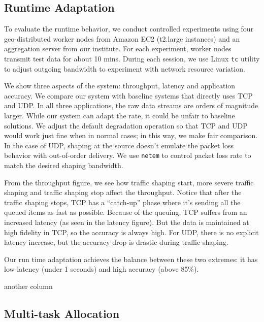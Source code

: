 \newpage

\subsection{Runtime Adaptation}
\label{sec:runtime-adaptation}

To evaluate the runtime behavior, we conduct controlled experiments using four
geo-distributed worker nodes from Amazon EC2 (t2.large instances) and an
aggregation server from our institute. For each experiment, worker nodes
transmit test data for about 10 mins. During each session, we use Linux
\texttt{tc} utility to adjust outgoing bandwidth to experiment with network
resource variation.

We show three aspects of the system: throughput, latency and application
accuracy. We compare our system with baseline systems that directly uses TCP and
UDP. In all three applications, the raw data streams are orders of magnitude
larger. While our system can adapt the rate, it could be unfair to baseline
solutions. We adjust the default degradation operation so that TCP and UDP would
work just fine when in normal cases; in this way, we make fair comparison. In
the case of UDP, shaping at the source doesn't emulate the packet loss behavior
with out-of-order delivery. We use \texttt{netem} to control packet loss rate to
match the desired shaping bandwidth.

From the throughput figure, we see how traffic shaping start, more severe
traffic shaping and traffic shaping stop affect the throughput. Notice that
after the traffic shaping stops, TCP has a ``catch-up'' phase where it's sending
all the queued items as fast as possible. Because of the queuing, TCP suffers
from an increased latency (as seen in the latency figure). But the data is
maintained at high fidelity in TCP, so the accuracy is always high. For UDP,
there is no explicit latency increase, but the accuracy drop is drastic during
traffic shaping.

Our run time adaptation achieves the balance between these two extremes: it has
low-latency (under 1 seconds) and high accuracy (above 85\%).

\newpage

another column

\newpage

\subsection{Multi-task Allocation}
\label{sec:multi-task-alloc}

